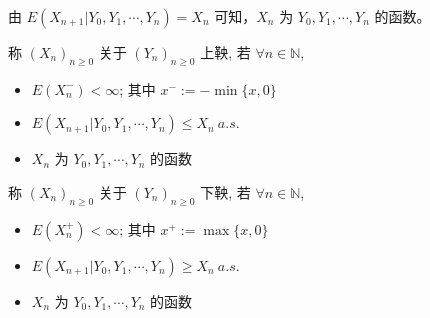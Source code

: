 \documentclass[lang=cn,10pt,thmcnt=section]{elegantbook}
\begin{document}
\begin{remark}
	由 $E(X_{n+1} | Y_0, Y_1, \cdots, Y_n) = X_n$ 可知，$X_n$ 为 $Y_0, Y_1, \cdots, Y_n$ 的函数。
\end{remark}
\begin{definition}[上鞅]
	称 $(X_n)_{n \geq 0}$ 关于 $(Y_n)_{n \geq 0}$ 上鞅, 若 $\forall n \in \mathbb{N}$,
\begin{itemize}
    \item $E(X_n^-) < \infty$; 其中 $x^- := -\min\{x, 0\}$
    \item $E(X_{n+1} | Y_0, Y_1, \cdots, Y_n) \leq X_n \ a.s.$
    \item $X_n$ 为 $Y_0, Y_1, \cdots, Y_n$ 的函数
\end{itemize}
\end{definition}
\begin{definition}[下鞅]
	称 $(X_n)_{n \geq 0}$ 关于 $(Y_n)_{n \geq 0}$ 下鞅, 若 $\forall n \in \mathbb{N}$,
\begin{itemize}
    \item $E(X_n^+) < \infty$; 其中 $x^+ := \max\{x, 0\}$
    \item $E(X_{n+1} | Y_0, Y_1, \cdots, Y_n) \geq X_n \ a.s.$
    \item $X_n$ 为 $Y_0, Y_1, \cdots, Y_n$ 的函数
\end{itemize}
\end{definition}
\end{document}
